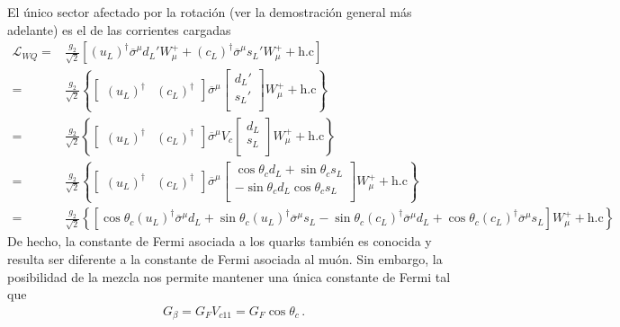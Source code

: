 El único sector afectado por la rotación (ver la demostración general más adelante) es el de las corrientes cargadas
\begin{align}
  \mathcal{L}_{WQ}=&\frac{g_2}{\sqrt{2}}\left[(u_L)^\dagger \overline{\sigma}^\mu d_L'W_\mu^++
  (c_L)^\dagger \overline{\sigma}^\mu s_L'W_\mu^++\text{h.c}\right] \nonumber\\
=&\frac{g_2}{\sqrt{2}}\left\{
  \begin{bmatrix}
 (u_L)^\dagger &  (c_L)^\dagger
  \end{bmatrix}
 \overline{\sigma}^\mu
  \begin{bmatrix}
    d_L' \\
    s_L'\\
  \end{bmatrix}
W_\mu^++\text{h.c}\right\} \nonumber\\
=&\frac{g_2}{\sqrt{2}}\left\{
  \begin{bmatrix}
 (u_L)^\dagger &  (c_L)^\dagger
  \end{bmatrix}
 \overline{\sigma}^\mu
  V_c\begin{bmatrix}
    d_L \\
    s_L\\
  \end{bmatrix}
W_\mu^++\text{h.c}\right\}\nonumber\\
=&\frac{g_2}{\sqrt{2}}\left\{
  \begin{bmatrix}
 (u_L)^\dagger &  (c_L)^\dagger
  \end{bmatrix}
 \overline{\sigma}^\mu
  \begin{bmatrix}
    \cos\theta_c d_L+\sin\theta_c s_L\\
    -\sin\theta_c d_L \cos\theta_c s_L\\
  \end{bmatrix}
W_\mu^++\text{h.c}\right\} \nonumber\\
=&\frac{g_2}{\sqrt{2}}\left\{
 \left[    \cos\theta_c(u_L)^\dagger  \overline{\sigma}^\mu  d_L
   + \sin\theta_c (u_L)^\dagger  \overline{\sigma}^\mu s_L
   - \sin\theta_c (c_L)^\dagger  \overline{\sigma}^\mu d_L
   + \cos\theta_c (c_L)^\dagger \overline{\sigma}^\mu    s_L
\right]W_\mu^++\text{h.c}\right\}
\end{align}
De hecho, la constante de Fermi asociada a los quarks también es conocida y resulta ser diferente a la constante de Fermi asociada al muón. Sin embargo, la posibilidad de la mezcla nos permite mantener una única constante de Fermi tal que
\begin{align}
  G_\beta=G_F V_{c11}=G_F\cos\theta_c\,.
\end{align}

